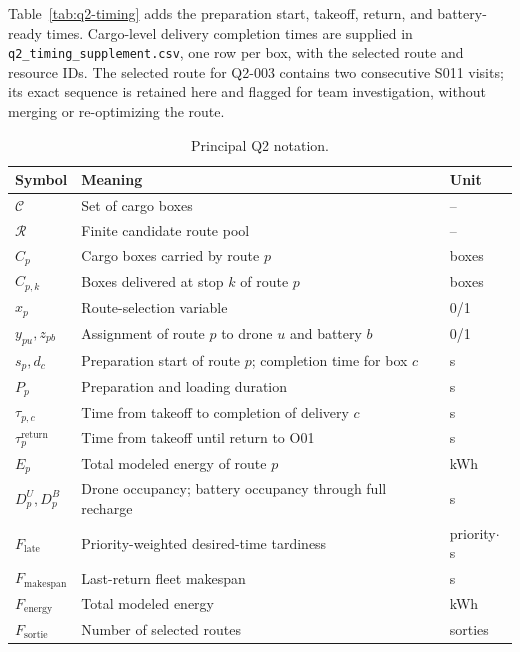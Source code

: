 \documentclass[11pt,a4paper]{article}
\begin{document}
Table~\ref{tab:q2-timing} adds the preparation start, takeoff, return, and battery-ready times. Cargo-level delivery completion times are supplied in \texttt{q2\_timing\_supplement.csv}, one row per box, with the selected route and resource IDs. The selected route for Q2-003 contains two consecutive S011 visits; its exact sequence is retained here and flagged for team investigation, without merging or re-optimizing the route.

\begin{table}[H]
\centering
\caption{Principal Q2 notation.}
\label{tab:q2-notation}
\small
\begin{tabularx}{\linewidth}{@{}lXl@{}}
\toprule
Symbol & Meaning & Unit\\
\midrule
$\mathcal C$ & Set of cargo boxes & --\\
$\mathcal R$ & Finite candidate route pool & --\\
$C_p$ & Cargo boxes carried by route $p$ & boxes\\
$C_{p,k}$ & Boxes delivered at stop $k$ of route $p$ & boxes\\
$x_p$ & Route-selection variable & 0/1\\
$y_{pu},z_{pb}$ & Assignment of route $p$ to drone $u$ and battery $b$ & 0/1\\
$s_p,d_c$ & Preparation start of route $p$; completion time for box $c$ & s\\
$P_p$ & Preparation and loading duration & s\\
$\tau_{p,c}$ & Time from takeoff to completion of delivery $c$ & s\\
$\tau_p^{\mathrm{return}}$ & Time from takeoff until return to O01 & s\\
$E_p$ & Total modeled energy of route $p$ & kWh\\
$D_p^U,D_p^B$ & Drone occupancy; battery occupancy through full recharge & s\\
$F_{\mathrm{late}}$ & Priority-weighted desired-time tardiness & priority$\cdot$s\\
$F_{\mathrm{makespan}}$ & Last-return fleet makespan & s\\
$F_{\mathrm{energy}}$ & Total modeled energy & kWh\\
$F_{\mathrm{sortie}}$ & Number of selected routes & sorties\\
\bottomrule
\end{tabularx}
\end{table}
\end{document}
